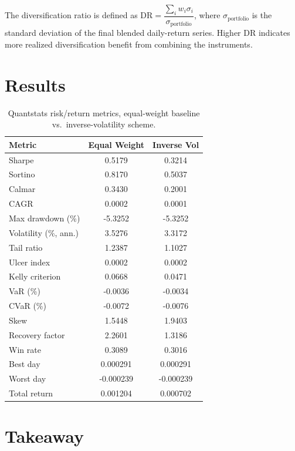 \documentclass[11pt]{article}
\begin{document}
The diversification ratio is defined as \(\mathrm{DR} = \dfrac{\sum_i w_i \sigma_i}{\sigma_{\text{portfolio}}}\),
where \(\sigma_{\text{portfolio}}\) is the standard deviation of the final blended
daily-return series. Higher DR indicates more realized diversification benefit from
combining the instruments.

\section{Results}

\begin{table}[h]
\centering
\caption{Quantstats risk/return metrics, equal-weight baseline vs.\ inverse-volatility scheme.}
\begin{tabular}{lS[table-format=-1.4]S[table-format=-1.4]}
\toprule
Metric & {Equal Weight} & {Inverse Vol} \\
\midrule
Sharpe                  & 0.5179  & 0.3214 \\
Sortino                 & 0.8170  & 0.5037 \\
Calmar                  & 0.3430  & 0.2001 \\
CAGR                    & 0.0002  & 0.0001 \\
Max drawdown (\%)       & -5.3252 & -5.3252 \\
Volatility (\%, ann.)   & 3.5276  & 3.3172 \\
Tail ratio              & 1.2387  & 1.1027 \\
Ulcer index             & 0.0002  & 0.0002 \\
Kelly criterion         & 0.0668  & 0.0471 \\
VaR (\%)                & -0.0036 & -0.0034 \\
CVaR (\%)                & -0.0072 & -0.0076 \\
Skew                    & 1.5448  & 1.9403 \\
Recovery factor         & 2.2601  & 1.3186 \\
\midrule
Win rate                & 0.3089  & 0.3016 \\
Best day                & 0.000291 & 0.000291 \\
Worst day               & -0.000239 & -0.000239 \\
Total return            & 0.001204 & 0.000702 \\
\bottomrule
\end{tabular}
\end{table}

\section{Takeaway}
\end{document}
